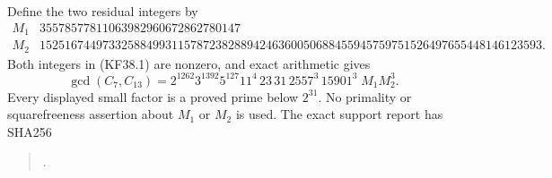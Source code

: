 Define the two residual integers by
{\footnotesize
\[
\begin{array}{c|r}
 M_1&35578577811063982960672862780147\\
 M_2&15251674497332588499311578723828894246360050688455945759751526497655448146123593.
\end{array}                                                \tag{KF38.2}
\]
}
Both integers in (KF38.1) are nonzero, and exact arithmetic gives
\[
 \gcd(C_7,C_{13})=
 2^{1262}3^{1392}5^{127}11^4\,23\,31\,2557^3\,15901^3
                                  \;M_1M_2^3.             \tag{KF38.3}
\]
Every displayed small factor is a proved prime below $2^{31}$.
No primality or squarefreeness assertion about $M_1$ or $M_2$
is used.  The exact support report has SHA256
\begin{quote}\small
{}.
\end{quote}

